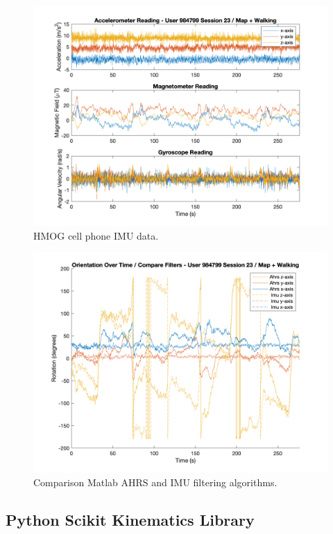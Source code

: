 \documentclass{article}
\begin{document}
\begin{figure}[ht]
  \includegraphics[width=1\linewidth]{images/984799_23_acc_mag_gyr_data.png}
  \caption[]{HMOG cell phone IMU data.}
  \label{fig:984799_23_imu}
\end{figure}

\begin{figure}[ht]
  \includegraphics[width=1\linewidth]{images/984799_23_orientation_compare_filters.png}
  \caption[]{Comparison Matlab AHRS and IMU filtering algorithms.}
  \label{fig:984799_23_compare_filter}
\end{figure}

\subsection{Python Scikit Kinematics Library}
\end{document}
